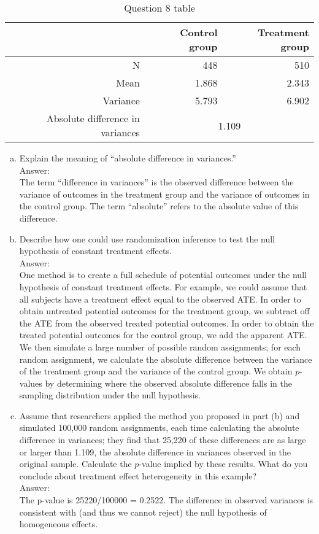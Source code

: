 \documentclass[11pt,notitlepage]{article}\usepackage[]{graphicx}\usepackage[]{color}
\begin{document}
\begin{table}[htbp]
  \centering
  \caption{Question 8 table}
    \begin{tabular}{rrr}
    \toprule
          & Control group  & Treatment group  \\
    \midrule
    N     & 448   & 510 \\
    Mean  & 1.868 & 2.343 \\
    Variance  & 5.793 & 6.902 \\
    Absolute difference in variances  & \multicolumn{2}{c}{1.109} \\
    \bottomrule
    \end{tabular}%
  \label{tab:addlabel}%
\end{table}%

\begin{enumerate}[a)]
\item Explain the meaning of ``absolute difference in variances.'' \\
Answer:\\
The term ``difference in variances'' is the observed difference between the variance of outcomes in the treatment group and the variance of outcomes in the control group. The term ``absolute'' refers to the absolute value of this difference.
\item Describe how one could use randomization inference to test the null hypothesis of constant treatment effects. \\
Answer:\\
One method is to create a full schedule of potential outcomes under the null hypothesis of constant treatment effects.  For example, we could assume that all subjects have a treatment effect equal to the observed ATE. In order to obtain untreated potential outcomes for the treatment group, we subtract off the ATE from the observed treated potential outcomes. In order to obtain the treated potential outcomes for the control group, we add the apparent ATE.  We then simulate a large number of possible random assignments; for each random assignment, we calculate the absolute difference between the variance of the treatment group and the variance of the control group. We obtain $p$-values by determining where the observed absolute difference falls in the sampling distribution under the null hypothesis.

\item Assume that researchers applied the method you proposed in part (b) and simulated 100,000 random assignments, each time calculating the absolute difference in variances; they find that 25,220 of these differences are as large or larger than 1.109, the absolute difference in variances observed in the original sample. Calculate the $p$-value implied by these results. What do you conclude about treatment effect heterogeneity in this example? \\
Answer:\\
The p-value is 25220/100000 = 0.2522.  The difference in observed variances is consistent with (and thus we cannot reject) the null hypothesis of homogeneous effects.


\end{enumerate}
\end{document}

